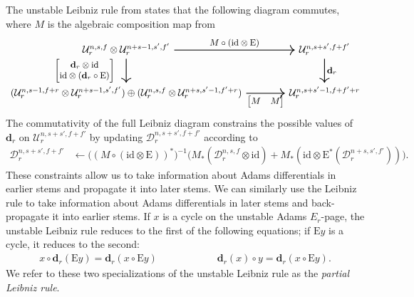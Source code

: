 \documentclass[dvipsnames,table]{amsart}
\theoremstyle{definition}
\theoremstyle{remark}
\numberwithin{equation}{section}
\newcommand{\update}{\mathrel{\gets}}
\begin{document}
\noindent The unstable Leibniz rule from  states that the following diagram commutes, where $M$ is the algebraic composition map from 
\begin{equation*}
\begin{tikzcd}[ampersand replacement=\&,
    every label/.append style={font=\small},
    every arrow/.append style={thick},
    row sep=2.5em, column sep=4em]
{\mathcal{U}_r^{n, s, f} \otimes \mathcal{U}_r^{n + s - 1, s', f'}} \& {\mathcal{U}_r^{n, s+s', f+f'}} \\
{(\mathcal{U}_r^{n, s-1, f+r} \otimes \mathcal{U}_r^{n + s - 1, s', f'}) \oplus (\mathcal{U}_r^{n, s, f} \otimes \mathcal{U}_r^{n+s, s'-1, f'+r})} \& {\mathcal{U}_r^{n, s+s'-1, f+f'+r}}
\arrow["{M \circ (\mathrm{id} \otimes \mathrm{E})}", from=1-1, to=1-2]
\arrow["{\begin{bmatrix}
    \mathbf{d}_r \otimes \mathrm{id}  \\ \mathrm{id} \otimes (\mathbf{d}_r \circ \mathrm{E})
\end{bmatrix}\quad}"',
    from=1-1, to=2-1]
\arrow["{\mathbf{d}_r}", from=1-2, to=2-2]
\arrow["{\begin{bmatrix} M & M \end{bmatrix}}"',
    from=2-1, to=2-2]
\end{tikzcd}
\end{equation*}
The commutativity of the full Leibniz diagram constrains the possible values of $\mathbf{d}_r$ on $\mathcal{U}_r^{n, s+s', f+f'}$ by updating $\mathcal{D}_r^{n, s+s', f+f'}$ according to
\begin{align*}
\mathcal{D}_r^{n, s+s', f+f'} &\update \bigl((M \circ (\mathrm{id} \otimes \mathrm{E}))^*\bigr)^{-1}\big(M_*(\mathcal{D}_r^{n, s, f} \otimes \mathrm{id}) + M_*(\mathrm{id} \otimes \mathrm{E}^*(\mathcal{D}_r^{n + s, s', f'}))\big).
\end{align*}
These constraints allow us to take information about Adams differentials in earlier stems and propagate it into later stems. We can similarly use the Leibniz rule to take information about Adams differentials in later stems and back-propagate it into earlier stems.
If $x$ is a cycle on the unstable Adams $E_r$-page, the unstable Leibniz rule reduces to the first of the following equations; if $\mathrm{E}y$ is a cycle, it reduces to the second:
\begin{align*}
  x \circ \mathbf{d}_r(\mathrm{E}y) = \mathbf{d}_r(x \circ \mathrm{E}y)
\qquad\qquad\qquad
\mathbf{d}_r(x) \circ y = \mathbf{d}_r(x \circ \mathrm{E}y).
\end{align*}
\noindent We refer to these two specializations of the unstable Leibniz rule as the \emph{partial Leibniz rule}.
\end{document}
